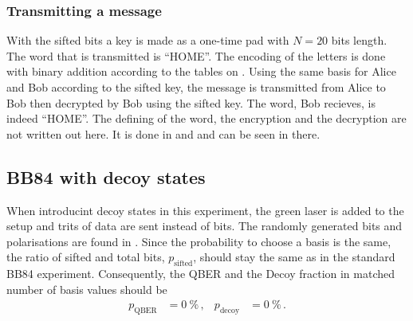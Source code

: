 \subsubsection{Transmitting a message}
With the sifted bits a key is made as a one-time pad with $N = 20$ bits length.
The word that is transmitted is \enquote{HOME}.
The encoding of the letters is done with binary addition according to the tables on .
\newline\noindent
Using the same basis for Alice and Bob according to the sifted key, the message is transmitted from Alice to Bob then decrypted by Bob using the sifted key.
The word, Bob recieves, is indeed \enquote{HOME}.
The defining of the word, the encryption and the decryption are not written out here.
It is done in  and  and can be seen in there.
%
\subsection{BB84 with decoy states}
When introducint decoy states in this experiment, the green laser is added to the setup and trits of data are sent instead of bits.
The randomly generated bits and polarisations are found in .
\newline\noindent
Since the probability to choose a basis is the same, the ratio of sifted and total bits, $p_{\mathrm{sifted}}$, should stay the same as in the standard BB84 experiment.
Consequently, the QBER and the Decoy fraction in matched number of basis values should be
\begin{align*}
    p_{\mathrm{QBER}} &= \qty{0}{\percent}\,, & p_{\mathrm{decoy}} &= \qty{0}{\percent}\,.
\end{align*}
%
